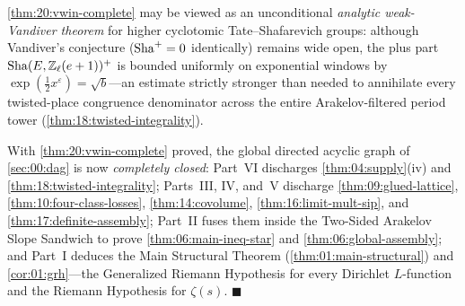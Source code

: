 \begin{remark}
\label{rem:20:weak-vandiver}
\cref{thm:20:vwin-complete} may be viewed as an unconditional \emph{analytic weak-Vandiver theorem} for higher cyclotomic Tate--Shafarevich groups: although Vandiver's conjecture ($\mathrm{Sha}^+ = 0$ identically) remains wide open, the plus part $\mathrm{Sha}(E, \mathbb{Z}_\ell(e+1))^+$ is bounded uniformly on exponential windows by $\exp(\frac{1}{2}x^\varepsilon) = \sqrt{b}$—an estimate strictly stronger than needed to annihilate every twisted-place congruence denominator across the entire Arakelov-filtered period tower (\cref{thm:18:twisted-integrality}).

With \cref{thm:20:vwin-complete} proved, the global directed acyclic graph of \cref{sec:00:dag} is now \emph{completely closed}: Part~VI discharges \cref{thm:04:supply}(iv) and \cref{thm:18:twisted-integrality}; Parts~III, IV, and~V discharge \cref{thm:09:glued-lattice}, \cref{thm:10:four-class-losses}, \cref{thm:14:covolume}, \cref{thm:16:limit-mult-sip}, and \cref{thm:17:definite-assembly}; Part~II fuses them inside the Two-Sided Arakelov Slope Sandwich to prove \cref{thm:06:main-ineq-star} and \cref{thm:06:global-assembly}; and Part~I deduces the Main Structural Theorem (\cref{thm:01:main-structural}) and \cref{cor:01:grh}—the Generalized Riemann Hypothesis for every Dirichlet $L$-function and the Riemann Hypothesis for $\zeta(s)$. $\blacksquare$
\end{remark}
